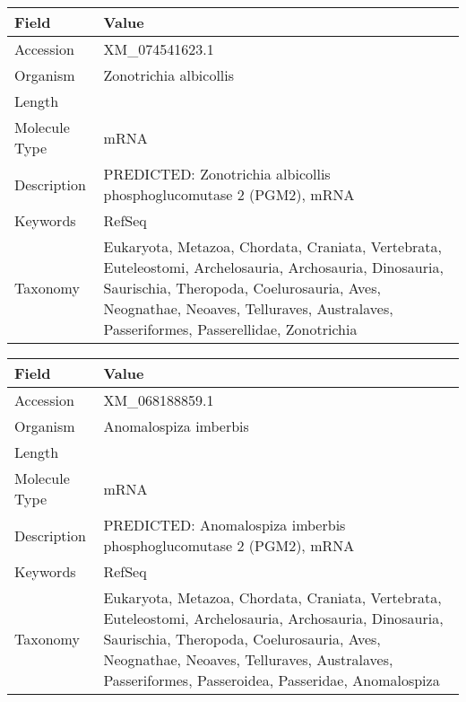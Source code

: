 \documentclass[10pt]{article}
\begin{document}
\vspace{1em}
{\footnotesize
\begin{longtable}{>{\raggedright\arraybackslash}p{4.5cm} >{\raggedright\arraybackslash}p{11.5cm}}
\textbf{Field} & \textbf{Value} \\
\hline
Accession & XM\_074541623.1 \\
Organism & Zonotrichia albicollis \\
Length & 2221 \\
Molecule Type & mRNA \\
Description & PREDICTED: Zonotrichia albicollis phosphoglucomutase 2 (PGM2), mRNA \\
Keywords & RefSeq \\
Taxonomy & Eukaryota, Metazoa, Chordata, Craniata, Vertebrata, Euteleostomi, Archelosauria, Archosauria, Dinosauria, Saurischia, Theropoda, Coelurosauria, Aves, Neognathae, Neoaves, Telluraves, Australaves, Passeriformes, Passerellidae, Zonotrichia \\
\end{longtable}
}

\vspace{1em}
{\footnotesize
\begin{longtable}{>{\raggedright\arraybackslash}p{4.5cm} >{\raggedright\arraybackslash}p{11.5cm}}
\textbf{Field} & \textbf{Value} \\
\hline
Accession & XM\_068188859.1 \\
Organism & Anomalospiza imberbis \\
Length & 2202 \\
Molecule Type & mRNA \\
Description & PREDICTED: Anomalospiza imberbis phosphoglucomutase 2 (PGM2), mRNA \\
Keywords & RefSeq \\
Taxonomy & Eukaryota, Metazoa, Chordata, Craniata, Vertebrata, Euteleostomi, Archelosauria, Archosauria, Dinosauria, Saurischia, Theropoda, Coelurosauria, Aves, Neognathae, Neoaves, Telluraves, Australaves, Passeriformes, Passeroidea, Passeridae, Anomalospiza \\
\end{longtable}
}
\end{document}
